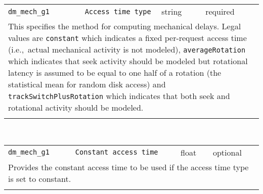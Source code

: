 \noindent 
\begin{tabular}{|p{\lpmodwidth}|p{\lpnamewidth}|p{0.5in}|p{0.5in}|}
\cline{1-4}
\texttt{dm\_mech\_g1} & \texttt{Access time type} & string & required \\ 
\cline{1-4}
\multicolumn{4}{|p{6in}|}{
This specifies the method for computing mechanical delays. Legal values
are \texttt{constant} which indicates a fixed per-request access time
(i.e.,~actual mechanical activity is not modeled),
\texttt{averageRotation} which indicates that seek activity should be
modeled but rotational latency is assumed to be equal to one half of
a rotation (the statistical mean for random disk access) and
\texttt{trackSwitchPlusRotation} which indicates that both seek and
rotational activity should be modeled.
}\\ 
\cline{1-4}
\multicolumn{4}{p{5in}}{}\\
\end{tabular}\\ 
\noindent 
\begin{tabular}{|p{\lpmodwidth}|p{\lpnamewidth}|p{0.5in}|p{0.5in}|}
\cline{1-4}
\texttt{dm\_mech\_g1} & \texttt{Constant access time} & float & optional \\ 
\cline{1-4}
\multicolumn{4}{|p{6in}|}{
Provides the constant access time to be used if the access time type
is set to constant.
}\\ 
\cline{1-4}
\multicolumn{4}{p{5in}}{}\\
\end{tabular}\\ 
\noindent 
